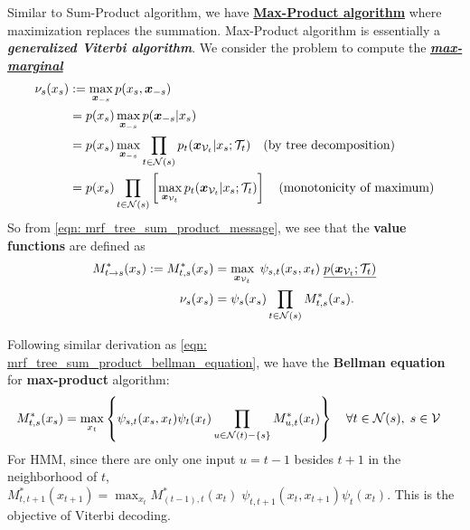 \documentclass[11pt]{article}
\begin{document}
Similar to Sum-Product algorithm, we have \underline{\textbf{Max-Product algorithm}} where maximization replaces the summation. Max-Product algorithm is essentially a \emph{\textbf{generalized Viterbi algorithm}}. We consider the problem  to compute the \underline{\textbf{\emph{max-marginal}}}
\begin{align}
\nu_{s}(x_{s}) &:= \max_{\boldsymbol{x}_{-s}}p(x_s, \boldsymbol{x}_{-s}) \label{eqn: mrf_tree_mode}\\
&= p(x_s)\max_{\boldsymbol{x}_{-s}}p(\boldsymbol{x}_{-s}|x_s) \nonumber \\
&= p(x_s)\max_{\boldsymbol{x}_{-s}}\prod_{t\in {\mathcal N}(s)}p_{t}(\boldsymbol{x}_{{\mathcal V}_{t}}|x_s; {\mathcal T}_{t})\quad (\text{by tree decomposition}) \nonumber\\
&= p(x_s)\prod_{t\in {\mathcal N}(s)}\left[\max_{\boldsymbol{x}_{{\mathcal V}_{t}}}p_{t}(\boldsymbol{x}_{{\mathcal V}_{t}}|x_s; {\mathcal T}_{t})\right]\quad (\text{monotonicity of maximum}) \nonumber
\end{align} 
So from \eqref{eqn: mrf_tree_sum_product_message}, we see that the \textbf{value functions} are defined as 
\begin{align}
M_{t \rightarrow s}^{*}(x_s) := M_{t,s}^{*}(x_s) &= \max_{\boldsymbol{x}_{{\mathcal V}_t}}\;\psi_{s,t}(x_s, x_t)\;\underline{p(\boldsymbol{x}_{{\mathcal V}_t}; {\mathcal T}_{t})} \label{eqn: mrf_tree_max_product_message} \\
\nu_{s}(x_{s}) &= \psi_{s}(x_s)\prod_{t \in {\mathcal N}(s)}M_{t,s}^{*}(x_s). \label{eqn: mrf_tree_max_product_marginal} 
\end{align}

Following similar derivation as \eqref{eqn: mrf_tree_sum_product_bellman_equation},  we have the \textbf{Bellman equation} for \textbf{max-product} algorithm:
\begin{align}
M_{t,s}^{*}(x_s) &= \max_{x_t}\left\{\psi_{s,t}(x_s, x_t)\psi_{t}(x_t)\prod_{u \in {\mathcal N}(t) - \left\{s\right\}}M_{u,t}^{*}(x_t)\right\}\quad \forall t\in {\mathcal N}(s),\; s \in {\mathcal V} \label{eqn: mrf_tree_max_product_bellman_equation}
\end{align} For HMM, since there are only one input $u=t-1$ besides $t+1$ in the neighborhood of $t$,  $M_{t,t+1}^{*}(x_{t+1}) = \max_{x_t}M_{(t-1),t}^{*}(x_t)\; \psi_{t, t+1}(x_t, x_{t+1})\psi_{t}(x_t)$. This is the objective of Viterbi decoding.
\end{document}
